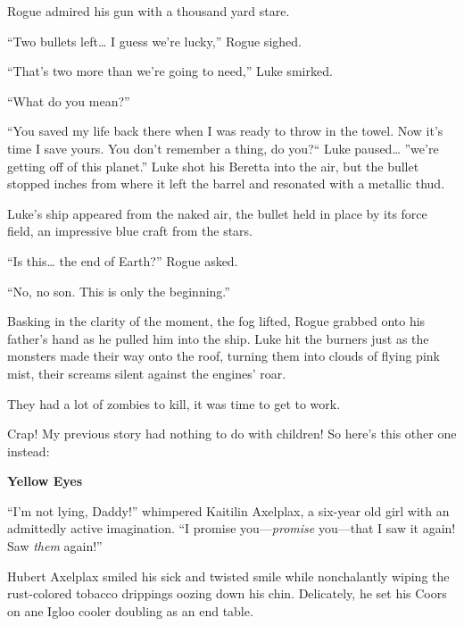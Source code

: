 Rogue admired his gun with a thousand yard stare.



``Two bullets left{\ldots} I guess we're lucky,'' Rogue
sighed.

``That's two more than we're going to need,''
Luke smirked.

``What do you mean?''

``You saved my life back there when I was ready to throw in
the towel. Now it's time I save yours. You don't remember a thing,
do you?`` Luke paused{\ldots} ''we're getting off of this
planet.'' Luke shot his Beretta into the air, but the bullet
stopped inches from where it left the barrel and resonated with a
metallic thud.



Luke's ship appeared from the naked air, the bullet held in
place by its force field, an impressive blue craft from the
stars.



``Is this{\ldots} the end of Earth?'' Rogue asked.

``No, no son. This is only the beginning.''



Basking in the clarity of the moment, the fog lifted, Rogue grabbed
onto his father's hand as he pulled him into the ship. Luke
hit the burners just as the monsters made their way onto the roof,
turning them into clouds of flying pink mist, their screams silent
against the engines' roar.



They had a lot of zombies to kill, it was time to get to work. 

 





Crap! My previous story had nothing to do with children! So here's
this other one instead:



{\bf Yellow Eyes}



``I'm not lying, Daddy!'' whimpered Kaitilin Axelplax, a six-year old
girl with an admittedly active imagination. ``I promise
you---{\em promise} you---that I saw it again! Saw
{\em them} again!''



Hubert Axelplax smiled his sick and twisted smile while
nonchalantly wiping the rust-colored tobacco drippings oozing down
his chin. Delicately, he set his Coors on ane Igloo cooler doubling
as an end table.



